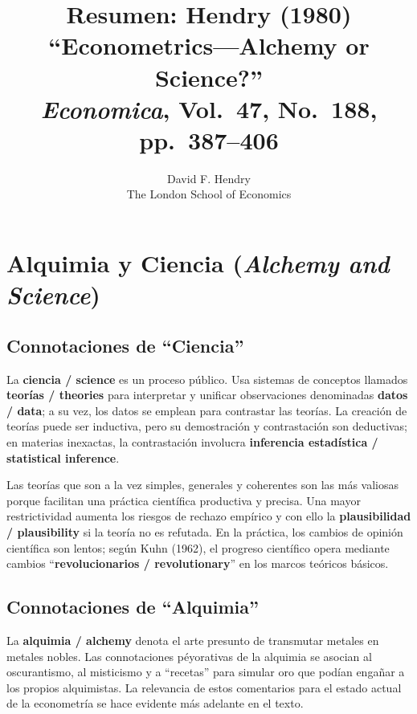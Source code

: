 \documentclass[12pt]{article}
\title{\textbf{Resumen: Hendry (1980)}\\
\large ``Econometrics---Alchemy or Science?''\\
\normalsize \textit{Economica}, Vol.~47, No.~188, pp.~387--406}
\author{David F. Hendry\\The London School of Economics}
\date{}
\begin{document}
\maketitle
\tableofcontents
\newpage

\section{Alquimia y Ciencia (\textit{Alchemy and Science})}

\subsection{Connotaciones de ``Ciencia''}

La \textbf{ciencia / science} es un proceso p\'ublico. Usa sistemas de conceptos llamados \textbf{teor\'ias / theories} para interpretar y unificar observaciones denominadas \textbf{datos / data}; a su vez, los datos se emplean para contrastar las teor\'ias. La creaci\'on de teor\'ias puede ser inductiva, pero su demostraci\'on y contrastaci\'on son deductivas; en materias inexactas, la contrastaci\'on involucra \textbf{inferencia estad\'istica / statistical inference}.

Las teor\'ias que son a la vez simples, generales y coherentes son las m\'as valiosas porque facilitan una pr\'actica cient\'ifica productiva y precisa. Una mayor restrictividad aumenta los riesgos de rechazo emp\'irico y con ello la \textbf{plausibilidad / plausibility} si la teor\'ia no es refutada. En la pr\'actica, los cambios de opini\'on cient\'ifica son lentos; seg\'un Kuhn (1962), el progreso cient\'ifico opera mediante cambios ``\textbf{revolucionarios / revolutionary}'' en los marcos te\'oricos b\'asicos.

\subsection{Connotaciones de ``Alquimia''}

La \textbf{alquimia / alchemy} denota el arte presunto de transmutar metales en metales nobles. Las connotaciones p\'eyorativas de la alquimia se asocian al oscurantismo, al misticismo y a ``recetas'' para simular oro que pod\'ian enga\~nar a los propios alquimistas. La relevancia de estos comentarios para el estado actual de la econometr\'ia se hace evidente m\'as adelante en el texto.
\end{document}
